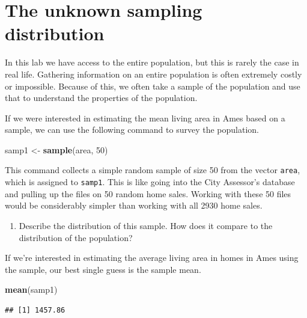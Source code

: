 \documentclass[]{book}
\newenvironment{Shaded}{\begin{snugshade}}{\end{snugshade}}
\newcommand{\KeywordTok}[1]{\textcolor[rgb]{0.13,0.29,0.53}{\textbf{{#1}}}}
\newcommand{\DecValTok}[1]{\textcolor[rgb]{0.00,0.00,0.81}{{#1}}}
\newcommand{\StringTok}[1]{\textcolor[rgb]{0.31,0.60,0.02}{{#1}}}
\newcommand{\NormalTok}[1]{{#1}}
\providecommand{\tightlist}{%
  \setlength{\itemsep}{0pt}\setlength{\parskip}{0pt}}
\theoremstyle{definition}
\theoremstyle{definition}
\theoremstyle{remark}
\begin{document}
\section*{The unknown sampling
distribution}\label{the-unknown-sampling-distribution}

In this lab we have access to the entire population, but this is rarely
the case in real life. Gathering information on an entire population is
often extremely costly or impossible. Because of this, we often take a
sample of the population and use that to understand the properties of
the population.

If we were interested in estimating the mean living area in Ames based
on a sample, we can use the following command to survey the population.

\begin{Shaded}
\begin{Highlighting}[]
\NormalTok{samp1 <-}\StringTok{ }\KeywordTok{sample}\NormalTok{(area, }\DecValTok{50}\NormalTok{)}
\end{Highlighting}
\end{Shaded}

This command collects a simple random sample of size 50 from the vector
\texttt{area}, which is assigned to \texttt{samp1}. This is like going
into the City Assessor's database and pulling up the files on 50 random
home sales. Working with these 50 files would be considerably simpler
than working with all 2930 home sales.

\begin{enumerate}
\def\labelenumi{\arabic{enumi}.}
\setcounter{enumi}{1}
\tightlist
\item
  Describe the distribution of this sample. How does it compare to the
  distribution of the population?
\end{enumerate}

If we're interested in estimating the average living area in homes in
Ames using the sample, our best single guess is the sample mean.

\begin{Shaded}
\begin{Highlighting}[]
\KeywordTok{mean}\NormalTok{(samp1)}
\end{Highlighting}
\end{Shaded}

\begin{verbatim}
## [1] 1457.86
\end{verbatim}
\end{document}
